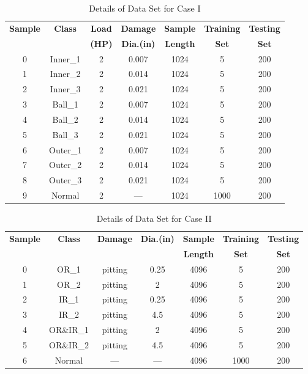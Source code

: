 \begin{table}[htbp]
\centering
\caption{Details of Data Set for Case I}
\label{tab:case1_details}
\begin{tabular}{ccccccc}
\hline
\textbf{Sample} & \textbf{Class} & \textbf{Load} & \textbf{Damage} & \textbf{Sample} & \textbf{Training} & \textbf{Testing} \\
 & & \textbf{(HP)} & \textbf{Dia.(in)} & \textbf{Length} & \textbf{Set} & \textbf{Set} \\ \hline
0 & Inner\_1 & 2 & 0.007 & 1024 & 5 & 200 \\
1 & Inner\_2 & 2 & 0.014 & 1024 & 5 & 200 \\
2 & Inner\_3 & 2 & 0.021 & 1024 & 5 & 200 \\
3 & Ball\_1 & 2 & 0.007 & 1024 & 5 & 200 \\
4 & Ball\_2 & 2 & 0.014 & 1024 & 5 & 200 \\
5 & Ball\_3 & 2 & 0.021 & 1024 & 5 & 200 \\
6 & Outer\_1 & 2 & 0.007 & 1024 & 5 & 200 \\
7 & Outer\_2 & 2 & 0.014 & 1024 & 5 & 200 \\
8 & Outer\_3 & 2 & 0.021 & 1024 & 5 & 200 \\
9 & Normal & 2 & --- & 1024 & 1000 & 200 \\
\hline
\end{tabular}
\end{table}

\begin{table}[htbp]
\centering
\caption{Details of Data Set for Case II}
\label{tab:case2_details}
\begin{tabular}{ccccccc}
\hline
\textbf{Sample} & \textbf{Class} & \textbf{Damage} & \textbf{Dia.(in)} & \textbf{Sample} & \textbf{Training} & \textbf{Testing} \\
 & & & & \textbf{Length} & \textbf{Set} & \textbf{Set} \\ \hline
0 & OR\_1 & pitting & 0.25 & 4096 & 5 & 200 \\
1 & OR\_2 & pitting & 2 & 4096 & 5 & 200 \\
2 & IR\_1 & pitting & 0.25 & 4096 & 5 & 200 \\
3 & IR\_2 & pitting & 4.5 & 4096 & 5 & 200 \\
4 & OR\&IR\_1 & pitting & 2 & 4096 & 5 & 200 \\
5 & OR\&IR\_2 & pitting & 4.5 & 4096 & 5 & 200 \\
6 & Normal & --- & --- & 4096 & 1000 & 200 \\
\hline
\end{tabular}
\end{table}

